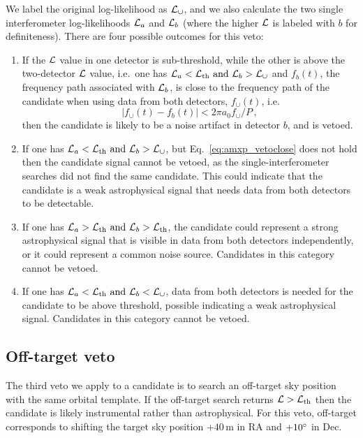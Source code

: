 We label the original log-likelihood as $\mathcal{L}_\cup$, and we also calculate the two single interferometer log-likelihoods $\mathcal{L}_a$ and $\mathcal{L}_b$ (where the higher $\mathcal{L}$ is labeled with $b$ for definiteness). There are four possible outcomes for this veto:
\begin{enumerate}
\item If the $\mathcal{L}$ value in one detector is sub-threshold, while the other is above the two-detector $\mathcal{L}$ value, i.e.~one has $\ml_a < \lth\ \textrm{and}\ \ml_b > \ml_\cup$ and $f_b(t)$, the frequency path associated with $\mathcal{L}_b$, is close to the frequency path of the candidate when using data from both detectors, $f_\cup(t)$, i.e.
\begin{equation}
|f_\cup(t) - f_b(t)| < 2\pi a_0 f_\cup / P\,, \label{eq:amxp_vetoclose}
\end{equation}
then the candidate is likely to be a noise artifact in detector $b$, and is vetoed.
\item If one has $\ml_a < \lth\ \textrm{and}\ \ml_b > \ml_\cup$, but Eq.~\eqref{eq:amxp_vetoclose} does not hold then the candidate signal cannot be vetoed, as the single-interferometer searches did not find the same candidate. This could indicate that the candidate is a weak astrophysical signal that needs data from both detectors to be detectable.
\item If one has $\ml_a > \lth\ \textrm{and}\ \ml_b > \lth$, the candidate could represent a strong astrophysical signal that is visible in data from both detectors independently, or it could represent a common noise source. Candidates in this category cannot be vetoed.
\item If one has $\ml_a < \lth\ \textrm{and}\ \ml_b < \ml_\cup$, data from both detectors is needed for the candidate to be above threshold, possible indicating a weak astrophysical signal. Candidates in this category cannot be vetoed.
\end{enumerate}

\subsection{Off-target veto \label{sec:amxp_ot_veto}}
The third veto we apply to a candidate is to search an off-target sky position with the same orbital template. If the off-target search returns $\mathcal{L} > \mathcal{L}_{\rm th}$ then the candidate is likely instrumental rather than astrophysical. For this veto, off-target corresponds to shifting the target sky position $+40\,$m in RA and $+10^{\circ}$ in Dec.


